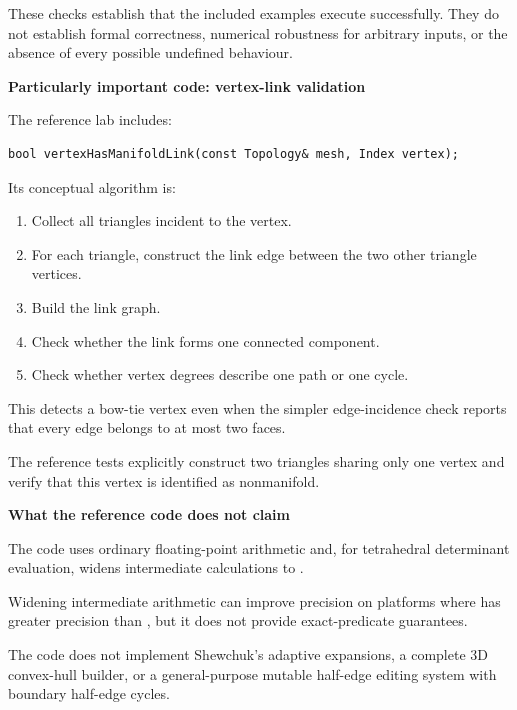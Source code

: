 These checks establish that the included examples execute successfully. They do not establish formal correctness, numerical robustness for arbitrary inputs, or the absence of every possible undefined behaviour.

\textbf{Particularly important code: vertex-link validation}

The reference lab includes:

\begin{verbatim}
bool vertexHasManifoldLink(const Topology& mesh, Index vertex);
\end{verbatim}

Its conceptual algorithm is:

\begin{enumerate}
\def\labelenumi{\arabic{enumi}.}
\tightlist
\item
  Collect all triangles incident to the vertex.
\item
  For each triangle, construct the link edge between the two other triangle vertices.
\item
  Build the link graph.
\item
  Check whether the link forms one connected component.
\item
  Check whether vertex degrees describe one path or one cycle.
\end{enumerate}

This detects a bow-tie vertex even when the simpler edge-incidence check reports that every edge belongs to at most two faces.

The reference tests explicitly construct two triangles sharing only one vertex and verify that this vertex is identified as nonmanifold.

\textbf{What the reference code does not claim}

The code uses ordinary floating-point arithmetic and, for tetrahedral determinant evaluation, widens intermediate calculations to .

Widening intermediate arithmetic can improve precision on platforms where  has greater precision than , but it does not provide exact-predicate guarantees.

The code does not implement Shewchuk's adaptive expansions, a complete 3D convex-hull builder, or a general-purpose mutable half-edge editing system with boundary half-edge cycles.

